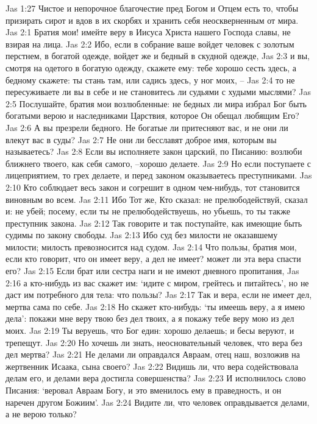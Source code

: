 Jas 1:27  Чистое и непорочное благочестие пред Богом и Отцем есть то, чтобы призирать сирот и вдов в их скорбях и хранить себя неоскверненным от мира.
Jas 2:1  Братия мои! имейте веру в Иисуса Христа нашего Господа славы, не взирая на лица.
Jas 2:2  Ибо, если в собрание ваше войдет человек с золотым перстнем, в богатой одежде, войдет же и бедный в скудной одежде,
Jas 2:3  и вы, смотря на одетого в богатую одежду, скажете ему: тебе хорошо сесть здесь, а бедному скажете: ты стань там, или садись здесь, у ног моих, --
Jas 2:4  то не пересуживаете ли вы в себе и не становитесь ли судьями с худыми мыслями?
Jas 2:5  Послушайте, братия мои возлюбленные: не бедных ли мира избрал Бог быть богатыми верою и наследниками Царствия, которое Он обещал любящим Его?
Jas 2:6  А вы презрели бедного. Не богатые ли притесняют вас, и не они ли влекут вас в суды?
Jas 2:7  Не они ли бесславят доброе имя, которым вы называетесь?
Jas 2:8  Если вы исполняете закон царский, по Писанию: возлюби ближнего твоего, как себя самого, --хорошо делаете.
Jas 2:9  Но если поступаете с лицеприятием, то грех делаете, и перед законом оказываетесь преступниками.
Jas 2:10  Кто соблюдает весь закон и согрешит в одном чем-нибудь, тот становится виновным во всем.
Jas 2:11  Ибо Тот же, Кто сказал: не прелюбодействуй, сказал и: не убей; посему, если ты не прелюбодействуешь, но убьешь, то ты также преступник закона.
Jas 2:12  Так говорите и так поступайте, как имеющие быть судимы по закону свободы.
Jas 2:13  Ибо суд без милости не оказавшему милости; милость превозносится над судом.
Jas 2:14  Что пользы, братия мои, если кто говорит, что он имеет веру, а дел не имеет? может ли эта вера спасти его?
Jas 2:15  Если брат или сестра наги и не имеют дневного пропитания,
Jas 2:16  а кто-нибудь из вас скажет им: `идите с миром, грейтесь и питайтесь', но не даст им потребного для тела: что пользы?
Jas 2:17  Так и вера, если не имеет дел, мертва сама по себе.
Jas 2:18  Но скажет кто-нибудь: `ты имеешь веру, а я имею дела': покажи мне веру твою без дел твоих, а я покажу тебе веру мою из дел моих.
Jas 2:19  Ты веруешь, что Бог един: хорошо делаешь; и бесы веруют, и трепещут.
Jas 2:20  Но хочешь ли знать, неосновательный человек, что вера без дел мертва?
Jas 2:21  Не делами ли оправдался Авраам, отец наш, возложив на жертвенник Исаака, сына своего?
Jas 2:22  Видишь ли, что вера содействовала делам его, и делами вера достигла совершенства?
Jas 2:23  И исполнилось слово Писания: `веровал Авраам Богу, и это вменилось ему в праведность, и он наречен другом Божиим'.
Jas 2:24  Видите ли, что человек оправдывается делами, а не верою только?
